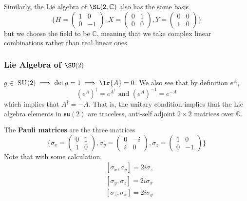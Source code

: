   Similarly, the Lie algebra of $\SL(2, \mathbb{C})$ also has the same basis 
  \begin{equation}
    \bigg\{ H = \begin{pmatrix}
    1&0\\0&-1
    \end{pmatrix}, X = \begin{pmatrix}
    0&1\\0&0
    \end{pmatrix}, Y = \begin{pmatrix}
    0&0\\1&0
    \end{pmatrix}\bigg\}
  \end{equation}
  but we choose the field to be $\mathbb{C}$, meaning that we take complex linear combinations rather than real linear ones. 

\subsubsection[Lie Algebra of SU(2)]{Lie Algebra of \(\SU(2)\)}

  $g \in $ SU$(2) \implies \det{g} = 1 \implies \Tr{A} = 0$. We also see that by definition $e^A$, 
  \begin{equation}
    (e^A)^\dagger = e^{A^\dagger} \text{ and } (e^A)^{-1} = e^{-A}
  \end{equation}
  which implies that $A^\dagger = - A$. That is, the unitary condition implies that the Lie algebra elements in $\mathfrak{su}(2)$ are traceless, anti-self adjoint $2 \times 2$ matrices over $\mathbb{C}$. 

  \begin{definition}
    \label{def:pauli-matrices}
    The \textbf{Pauli matrices} are the three matrices
    \begin{equation}
      \bigg\{ \sigma_x = \begin{pmatrix}
      0&1\\1&0
      \end{pmatrix}, \sigma_y = \begin{pmatrix}
      0&-i\\i&0
      \end{pmatrix}, \sigma_z = \begin{pmatrix}
      1&0\\0&-1
      \end{pmatrix}\bigg\}
    \end{equation}
    Note that with some calculation, 
    \begin{align*}
      & [\sigma_x, \sigma_y] = 2 i \sigma_z \\
      & [\sigma_y, \sigma_z] = 2 i \sigma_x \\
      & [\sigma_z, \sigma_x] = 2 i \sigma_y
    \end{align*}
  \end{definition}

